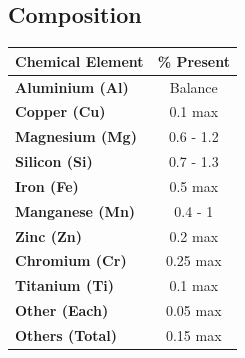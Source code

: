 \documentclass{article}
\begin{document}
\subsection{Composition}
\centering
\begin{minipage}{0.44\textwidth}
    \centering
    \renewcommand{\arraystretch}{1.4}

        \begin{tabular}{|>{\normalsize\bfseries}l|>{\normalsize}c|}
            \hline
            \large \textbf{Chemical Element} & \textbf{\% Present} \\ \hline
            Aluminium (Al)            & Balance             \\ \hline
            Copper (Cu)               & 0.1 max        \\ \hline
            Magnesium (Mg)            & 0.6 - 1.2         \\ \hline
            Silicon (Si)              & 0.7 - 1.3         \\ \hline
            Iron (Fe)                 & 0.5 max         \\ \hline
            Manganese (Mn)            & 0.4 - 1         \\ \hline
            Zinc (Zn)                 & 0.2 max        \\ \hline
            Chromium (Cr)             & 0.25 max        \\ \hline
            Titanium (Ti)             & 0.1 max        \\ \hline
            Other (Each)              & 0.05 max        \\ \hline
            Others (Total)            & 0.15 max        \\ \hline
        \end{tabular}
        \label{tab:composition_6082}


\end{minipage}
\end{document}
